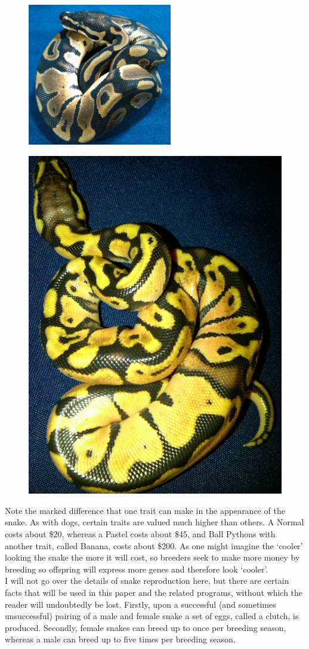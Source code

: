 \documentclass{article}
\begin{document}
	\begin{multicols}{2}
	\begin{figure}[H]
	\centering
	\includegraphics[width=.5\textwidth, height = 62mm]{Normal.jpg}
	\end{figure}
	\begin{figure}[H]
	\centering
	\includegraphics[width=.5\textwidth]{Pastel.jpg}
	\end{figure}
	\end{multicols}
	Note the marked difference that one trait can make in the appearance of the snake. As with dogs, certain traits are valued much higher than others. A Normal costs about \$20, whereas a Pastel costs about \$45, and Ball Pythons with another trait, called Banana, costs about \$200. As one might imagine the `cooler' looking the snake the more it will cost, so breeders seek to make more money by breeding so offspring will express more genes and therefore look `cooler'.\\
	\indent I will not go over the details of snake reproduction here, but there are certain facts that will be used in this paper and the related programs, without which the reader will undoubtedly be lost. Firstly, upon a successful (and sometimes unsuccessful) pairing of a male and female snake a set of eggs, called a clutch, is produced. Secondly, female snakes can breed up to once per breeding season, whereas a male can breed up to five times per breeding season.
\end{document}
